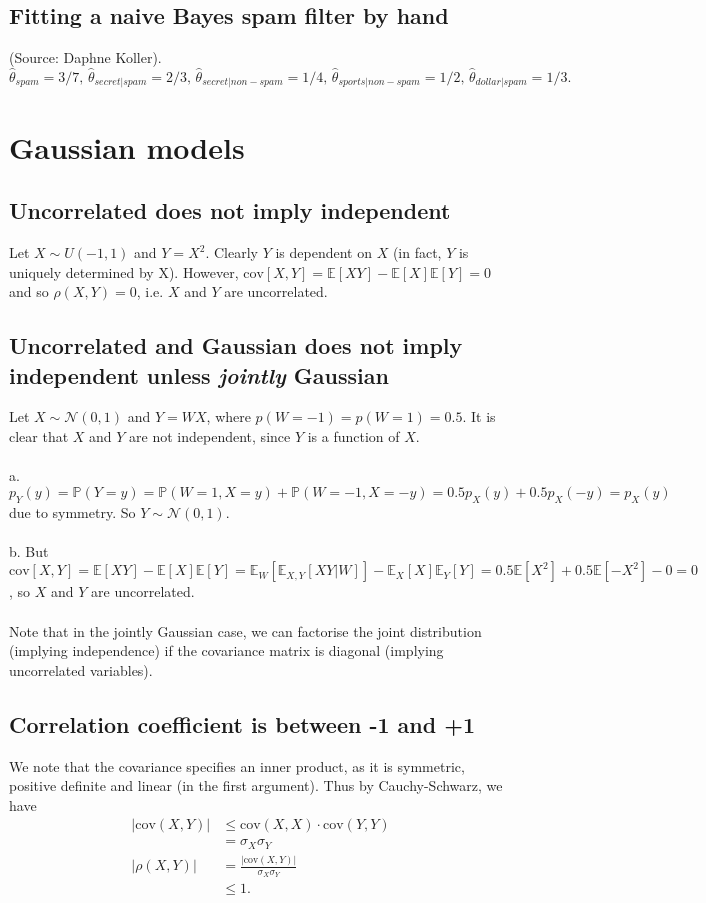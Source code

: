 \documentclass{article}
\begin{document}
\subsection{Fitting a naive Bayes spam filter by hand}
(Source: Daphne Koller). $\hat\theta_{spam} = 3/7,\, \hat\theta_{secret|spam} = 2/3,\, \hat\theta_{secret|non-spam} = 1/4,\, \hat\theta_{sports|non-spam} = 1/2,\, \hat\theta_{dollar|spam} = 1/3.$
\pagebreak

\section{Gaussian models}
\subsection{Uncorrelated does not imply independent}
Let $X \sim U(-1,1)$ and $Y = X^2$. Clearly $Y$ is dependent on $X$ (in fact, $Y$ is uniquely determined by X). However, $\mathrm{cov}[X,Y] = \mathbb{E}[XY]-\mathbb{E}[X]\mathbb{E}[Y] = 0$ and so $\rho(X,Y)=0$, i.e. $X$ and $Y$ are uncorrelated.

\subsection{Uncorrelated and Gaussian does not imply independent unless \textit{jointly} Gaussian}
Let $X \sim \mathcal{N}(0,1)$ and $Y=WX$, where $p(W=-1)=p(W=1)=0.5$. It is clear that $X$ and $Y$ are not independent, since $Y$ is a function of $X$.\\\\
a. $p_Y(y) = \mathbb{P}(Y=y) = \mathbb{P}(W=1,X=y) + \mathbb{P}(W=-1,X=-y) = 0.5p_X(y) + 0.5p_X(-y) = p_X(y)$ due to symmetry. So $Y \sim \mathcal{N}(0,1)$.\\\\
b. But $\mathrm{cov}[X,Y] = \mathbb{E}[XY] - \mathbb{E}[X]\mathbb{E}[Y] = \mathbb{E}_W[\mathbb{E}_{X,Y}[XY|W]] - \mathbb{E}_X[X]\mathbb{E}_Y[Y] = 0.5\mathbb{E}[X^2] + 0.5\mathbb{E}[-X^2] - 0 = 0$, so $X$ and $Y$ are uncorrelated.\\\\
Note that in the jointly Gaussian case, we can factorise the joint distribution (implying independence) if the covariance matrix is diagonal (implying uncorrelated variables).

\subsection{Correlation coefficient is between -1 and +1}
We note that the covariance specifies an inner product, as it is symmetric, positive definite and linear (in the first argument). Thus by Cauchy-Schwarz, we have
\begin{align*}
|\mathrm{cov}(X,Y)| &\leq \mathrm{cov}(X,X) \cdot \mathrm{cov}(Y,Y)\\
&= \sigma_X\sigma_Y\\
|\rho(X,Y)| &= \frac{|\mathrm{cov}(X,Y)|}{\sigma_X\sigma_Y}\\
&\leq 1.
\end{align*}
\end{document}
